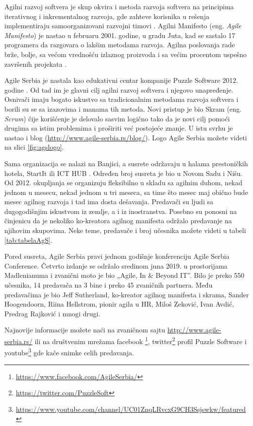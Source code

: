 \documentclass[a4paper]{article}
\begin{document}
{Agilni razvoj softvera je skup okvira i metoda razvoja softvera na principima iterativnog i inkrementalnog razvoja, gde zahteve korisnika u rešenja implementiraju samoorganizovani razvojni timovi \cite{agileForDummies}. Agilni Manifesto (eng. \textit{Agile Manifesto}) je nastao u februaru 2001. godine, u gradu Juta, kad se sastalo 17 programera da razgovara o lakšim metodama razvoja. Agilna poslovanja rade brže, bolje, sa većom vrednošću izlaznog proizvoda i sa većim procentom uspešno završenih projekata \cite{aboutAgileCom}.

Agile Serbia je nastala kao edukativni centar kompanije Puzzle Software 2012. godine \cite{aboutAgS}. Od tad im je glavni cilj agilni razvoj softvera i njegovo unapređenje. Osnivači imaju bogato iskustvo sa tradicionalnim metodama razvoja softvera i borili su se sa izazovima i manama tih metoda. Novi pristup je bio Skram (eng. \textit{Scrum}) čije korišćenje je delovalo sasvim logično tako da je novi cilj pomoći drugima sa istim problemima i proširiti već postojeće znanje. U istu svrhu je nastao i blog (\url{http://www.agile-serbia.rs/blog/}). Logo Agile Serbia možete videti na slici \ref{fig:agslogo}.

Sama organizacija se nalazi na Banjici, a susrete održavaju u halama prestoničkih hotela, StartIt \cite{aboutStarit} ili ICT HUB \cite{aboutICT}. Određen broj susreta je bio u Novom Sadu i Nišu. Od 2012. okupljanja se organizuju fleksibilno u skladu sa agilnim duhom, nekad jednom u mesecu, nekad jednom u tri meseca, sa time što mesec maj obično bude mesec agilnog razvoja i tad ima dosta dešavanja. Predavači su ljudi sa dugogodišnjim iskustvom iz zemlje, a i iz inostranstva. Posebno su ponosni na činjenicu da je nekoliko ko-kreatora agilnog manifesta održalo predavanje na njihovim skupovima. Neke teme, predavače i broj učesnika možete videti u tabeli \ref{tab:tabelaAgS}.

Pored susreta, Agile Serbia pravi jednom godišnje konferenciju Agile Serbia Conference. Četvrto izdanje se održalo sredinom juna 2019. u prostorijama Madlenianuma i zvanični moto je bio „Agile, In \& Beyond IT''. Bilo je preko 550 učesnika, 14 predavača na 3 bine i preko 45 zvaničnih partnera. Među predavačima je bio Jeff Sutherland, ko-kreator agilnog manifesta i skrama, Sander Hoogendoorn, Riina Hellstrom, pionir agila u HR, Miloš Zeković, Ivan Avdić, Predrag Rajković i mnogi drugi.

Najnovije informacije možete naći na zvaničnom sajtu  \url{http://www.agile-serbia.rs/} ili na društvenim mrežama facebook \footnote{\url{https://www.facebook.com/AgileSerbia/}}, twitter\footnote{\url{https://twitter.com/PuzzleSoft}} profil Puzzle Software i youtube\footnote{\url{https://www.youtube.com/channel/UC01ZnqLRvcxG9CH3Ssjswkw/featured}} gde kače snimke celih predavanja.

}
\end{document}
